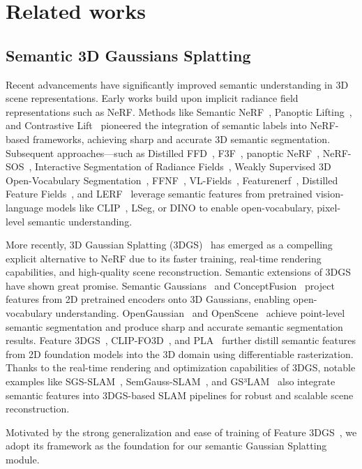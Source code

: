 \section{Related works}
\subsection{Semantic 3D Gaussians Splatting}
Recent advancements have significantly improved semantic understanding in 3D scene representations. Early works build upon implicit radiance field representations such as NeRF. Methods like Semantic NeRF~\cite{semanticnerf}, Panoptic Lifting~\cite{Panopticlifting}, and Contrastive Lift~\cite{ContrastiveLift} pioneered the integration of semantic labels into NeRF-based frameworks, achieving sharp and accurate 3D semantic segmentation. Subsequent approaches—such as Distilled FFD~\cite{FFD}, F3F~\cite{F3F}, panoptic NeRF~\cite{panopticnerf}, NeRF-SOS~\cite{nerfsos}, Interactive Segmentation of Radiance Fields~\cite{ISRF}, Weakly Supervised 3D Open-Vocabulary Segmentation~\cite{weakly}, FFNF~\cite{FFNF}, VL-Fields~\cite{VL-Fields}, Featurenerf~\cite{featurenerf}, Distilled Feature Fields~\cite{DistilledFF}, and LERF~\cite{lerf} leverage semantic features from pretrained vision-language models like CLIP~\cite{CLIP}, LSeg\cite{Lseg}, or DINO\cite{dino} to enable open-vocabulary, pixel-level semantic understanding.

More recently, 3D Gaussian Splatting (3DGS)~\cite{3DGS} has emerged as a compelling explicit alternative to NeRF due to its faster training, real-time rendering capabilities, and high-quality scene reconstruction. Semantic extensions of 3DGS have shown great promise. Semantic Gaussians~\cite{semanticgs} and ConceptFusion~\cite{conceptfusion} project features from 2D pretrained encoders onto 3D Gaussians, enabling open-vocabulary understanding. OpenGaussian~\cite{open} and OpenScene~\cite{openscene} achieve point-level semantic segmentation and produce sharp and accurate semantic segmentation results. Feature 3DGS~\cite{feature3dgs}, CLIP-FO3D~\cite{Clip-fo3d}, and PLA~\cite{pla} further distill semantic features from 2D foundation models into the 3D domain using differentiable rasterization. Thanks to the real-time rendering and optimization capabilities of 3DGS, notable examples like SGS-SLAM~\cite{sgs}, SemGauss-SLAM~\cite{sem-slam}, and GS³LAM~\cite{gs3lam} also integrate semantic features into 3DGS-based SLAM pipelines for robust and scalable scene reconstruction.

Motivated by the strong generalization and ease of training of Feature 3DGS~\cite {feature3dgs}, we adopt its framework as the foundation for our semantic Gaussian Splatting module.


